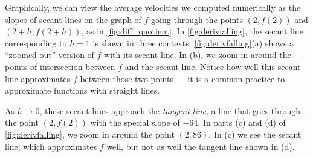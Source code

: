 
Graphically, we can view the average velocities we computed numerically as the slopes of secant lines on the graph of $f$ going through the points $(2,f(2))$ and $(2+h,f(2+h))$, as in \autoref{fig:diff_quotient}. In \autoref{fig:derivfalling}, the secant line corresponding to $h=1$ is shown in three contexts. \autoref{fig:derivfalling}(a) shows a ``zoomed out'' version of $f$ with its secant line. In (b), we zoom in around the points of intersection between $f$ and the secant line. Notice how well this secant line approximates $f$ between those two points --- it is a common practice to approximate functions with straight lines.

As $h\to 0$, these secant lines approach the \emph{tangent line}, a line that goes through the point $(2,f(2))$ with the special slope of $-64$. In parts (c) and (d) of \autoref{fig:derivfalling}, we zoom in around the point $(2,86)$. In (c) we see the secant line, which approximates $f$ well, but not as well the tangent line shown in (d).

